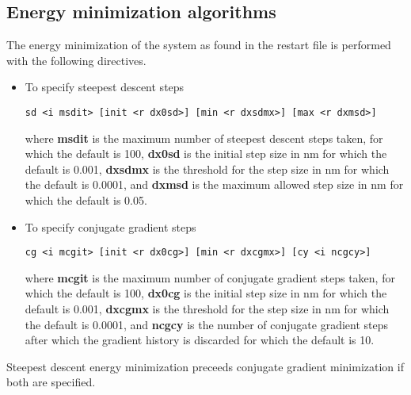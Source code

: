 \subsection{Energy minimization algorithms}
The energy minimization of the system as found in the restart file 
is performed with the following directives.
\begin{itemize}
\item
To specify steepest descent steps
\begin{verbatim}
sd <i msdit> [init <r dx0sd>] [min <r dxsdmx>] [max <r dxmsd>] 
\end{verbatim}
where {\bf msdit} is the maximum number of steepest descent steps taken,
for which the default is 100, {\bf dx0sd} is the initial step size in nm
for which the default is 0.001, {\bf dxsdmx} is the threshold for the
step size in nm for which the default is 0.0001, and {\bf dxmsd} is the
maximum allowed step size in nm for which the default is 0.05.
\item
To specify conjugate gradient steps
\begin{verbatim}
cg <i mcgit> [init <r dx0cg>] [min <r dxcgmx>] [cy <i ncgcy>]
\end{verbatim}
where {\bf mcgit} is the maximum number of conjugate gradient steps taken,
for which the default is 100, {\bf dx0cg} is the initial step size in nm
for which the default is 0.001, {\bf dxcgmx} is the threshold for the
step size in nm for which the default is 0.0001, and {\bf ncgcy}
is the number of conjugate gradient steps after which the gradient history
is discarded for which the default is 10.
\end{itemize}
Steepest descent energy minimization preceeds conjugate 
gradient minimization if both are specified.
